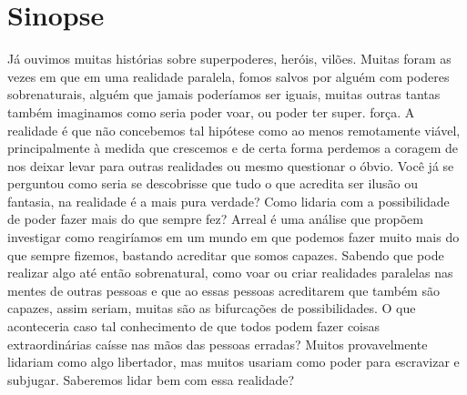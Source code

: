 \chapter*{Sinopse}
Já ouvimos muitas histórias sobre superpoderes, heróis, vilões. Muitas foram as vezes em que em uma realidade paralela, fomos salvos por alguém com poderes sobrenaturais, alguém que jamais poderíamos ser iguais, muitas outras tantas também imaginamos como seria poder voar, ou poder ter super. força. A realidade é que não concebemos tal hipótese como ao menos remotamente viável, principalmente à medida que crescemos e de certa forma perdemos a coragem de nos deixar levar para outras realidades ou mesmo questionar o óbvio.
Você já se perguntou como seria se descobrisse que tudo o que acredita ser ilusão ou fantasia, na realidade é a mais pura verdade?
Como lidaria com a possibilidade de poder fazer mais do que sempre fez?
Arreal é uma análise que propõem investigar como reagiríamos em um mundo em que podemos fazer muito mais do que sempre fizemos, bastando acreditar que somos capazes. 
Sabendo que pode realizar algo até então sobrenatural, como voar ou criar realidades paralelas nas mentes de outras pessoas e que ao essas pessoas acreditarem que também são capazes, assim seriam, muitas são as bifurcações de possibilidades.
O que aconteceria caso tal conhecimento de que todos podem fazer coisas extraordinárias caísse nas mãos das pessoas erradas? 
Muitos provavelmente lidariam como algo libertador, mas muitos usariam como poder para escravizar e subjugar.
Saberemos lidar bem com essa realidade?

